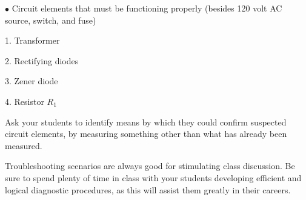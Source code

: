 \medskip
\goodbreak
\item{$\bullet$} Circuit elements that must be functioning properly (besides 120 volt AC source, switch, and fuse)
\item{1.} Transformer
\item{2.} Rectifying diodes
\item{3.} Zener diode
\item{4.} Resistor $R_1$
\medskip







Ask your students to identify means by which they could confirm suspected circuit elements, by measuring something other than what has already been measured.

Troubleshooting scenarios are always good for stimulating class discussion.  Be sure to spend plenty of time in class with your students developing efficient and logical diagnostic procedures, as this will assist them greatly in their careers.




